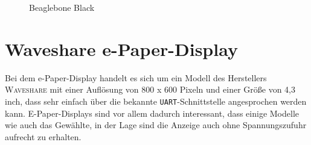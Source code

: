 \begin{figure}[ht]
  \centering
  \caption{Beaglebone Black}
  \label{pic:Beaglebone}
\end{figure}


\section{Waveshare e-Paper-Display}
Bei dem e-Paper-Display handelt es sich um ein Modell des Herstellers \textsc{Waveshare} mit einer Auflösung von 800 x 600 Pixeln und einer Größe von 4,3 inch, dass sehr einfach über die bekannte \texttt{UART}-Schnittstelle angesprochen werden kann. 
E-Paper-Displays sind vor allem dadurch interessant, dass einige Modelle wie auch das Gewählte, in der Lage sind die Anzeige auch ohne Spannungszufuhr aufrecht zu erhalten.

